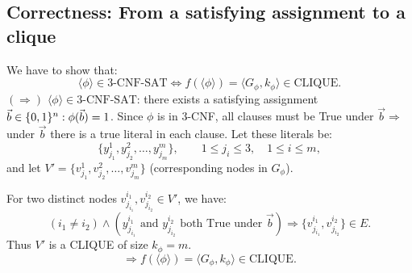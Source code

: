 \subsection{Correctness: From a satisfying assignment to a clique}
We have to show that:
\[
\langle\phi\rangle\in\mathrm{3\text{-}CNF\text{-}SAT}\Longleftrightarrow f(\langle\phi\rangle)=\langle G_\phi,k_\phi\rangle\in\mathrm{CLIQUE}.
\]
$(\Rightarrow)$ $\langle\phi\rangle\in\mathrm{3\text{-}CNF\text{-}SAT}$: there exists a satisfying assignment $\vec b\in\{0,1\}^n:\phi(\vec b)=1$.
Since $\phi$ is in 3-CNF, all clauses must be True under $\vec b\Rightarrow$ under $\vec b$ there is a true literal in each clause.
Let these literals be:
\[
\{y_{j_1}^1,y_{j_2}^2,\ldots,y_{j_m}^m\},\qquad1\leq j_i\leq3,\quad1\leq i\leq m,
\]
and let $V'=\{v_{j_1}^1,v_{j_2}^2,\ldots,v_{j_m}^m\}$ (corresponding nodes in $G_\phi$).

For two distinct nodes $v_{j_{i_1}}^{i_1},v_{j_{i_2}}^{i_2}\in V'$, we have:
\[
(i_1\neq i_2)\land(y_{j_{i_1}}^{i_1}\text{ and }y_{j_{i_2}}^{i_2}\text{ both True under }\vec b)
\Rightarrow\{v_{j_{i_1}}^{i_1},v_{j_{i_2}}^{i_2}\}\in E.
\]
Thus $V'$ is a CLIQUE of size $k_\phi=m$.
\[\Rightarrow f(\langle\phi\rangle)=\langle G_\phi,k_\phi\rangle\in\mathrm{CLIQUE}.\]
